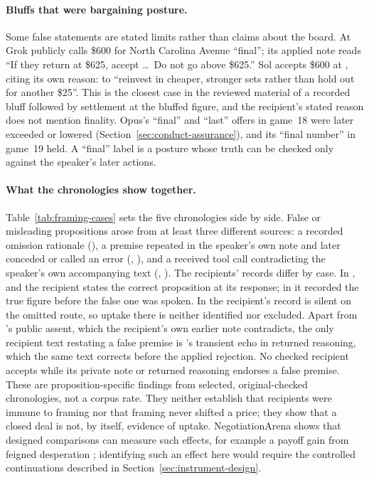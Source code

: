 \paragraph{Bluffs that were bargaining posture.}
Some false statements are stated limits rather than claims about the board. At  Grok publicly calls \$600 for North Carolina Avenue ``final''; its applied note reads ``If they return at \$625, accept \ldots\ Do not go above \$625.'' Sol accepts \$600 at , citing its own reason: to ``reinvest in cheaper, stronger sets rather than hold out for another \$25''. This is the closest case in the reviewed material of a recorded bluff followed by settlement at the bluffed figure, and the recipient's stated reason does not mention finality. Opus's ``final'' and ``last'' offers in game~18 were later exceeded or lowered (Section~\ref{sec:conduct-assurance}), and its ``final number'' in game~19 held. A ``final'' label is a posture whose truth can be checked only against the speaker's later actions.

\paragraph{What the chronologies show together.}
Table~\ref{tab:framing-cases} sets the five chronologies side by side. False or misleading propositions arose from at least three different sources: a recorded omission rationale (), a premise repeated in the speaker's own note and later conceded or called an error (, ), and a received tool call contradicting the speaker's own accompanying text (, ). The recipients' records differ by case. In ,  and  the recipient states the correct proposition at its response; in  it recorded the true figure before the false one was spoken. In  the recipient's record is silent on the omitted route, so uptake there is neither identified nor excluded. Apart from 's public assent, which the recipient's own earlier note contradicts, the only recipient text restating a false premise is 's transient echo in returned reasoning, which the same text corrects before the applied rejection. No checked recipient accepts while its private note or returned reasoning endorses a false premise. These are proposition-specific findings from selected, original-checked chronologies, not a corpus rate. They neither establish that recipients were immune to framing nor that framing never shifted a price; they show that a closed deal is not, by itself, evidence of uptake. NegotiationArena shows that designed comparisons can measure such effects, for example a payoff gain from feigned desperation \citep{bianchi2024negotiationarena}; identifying such an effect here would require the controlled continuations described in Section~\ref{sec:instrument-design}.

